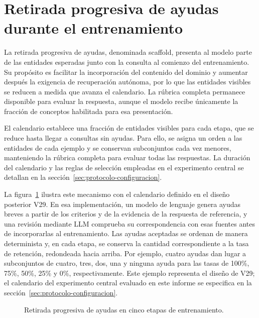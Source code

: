 \section{Retirada progresiva de ayudas durante el entrenamiento}
\label{sec:metodo-ayudas}
La retirada progresiva de ayudas, denominada scaffold, presenta al modelo parte de las entidades esperadas junto con la consulta al comienzo del entrenamiento. Su propósito es facilitar la incorporación del contenido del dominio y aumentar después la exigencia de recuperación autónoma, por lo que las entidades visibles se reducen a medida que avanza el calendario. La rúbrica completa permanece disponible para evaluar la respuesta, aunque el modelo recibe únicamente la fracción de conceptos habilitada para esa presentación.

El calendario establece una fracción de entidades visibles para cada etapa, que se reduce hasta llegar a consultas sin ayudas. Para ello, se asigna un orden a las entidades de cada ejemplo y se conservan subconjuntos cada vez menores, manteniendo la rúbrica completa para evaluar todas las respuestas. La duración del calendario y las reglas de selección empleadas en el experimento central se detallan en la sección~\ref{sec:protocolo-configuracion}.

La figura~\ref{fig:scaffolding-etapas} ilustra este mecanismo con el calendario definido en el diseño posterior V29. En esa implementación, un modelo de lenguaje genera ayudas breves a partir de los criterios y de la evidencia de la respuesta de referencia, y una revisión mediante LLM comprueba su correspondencia con esas fuentes antes de incorporarlas al entrenamiento. Las ayudas aceptadas se ordenan de manera determinista y, en cada etapa, se conserva la cantidad correspondiente a la tasa de retención, redondeada hacia arriba. Por ejemplo, cuatro ayudas dan lugar a subconjuntos de cuatro, tres, dos, una y ninguna ayuda para las tasas de 100\%, 75\%, 50\%, 25\% y 0\%, respectivamente. Este ejemplo representa el diseño de V29; el calendario del experimento central evaluado en este informe se especifica en la sección~\ref{sec:protocolo-configuracion}.

\begin{figure}[htbp]
\centering

\caption{Retirada progresiva de ayudas en cinco etapas de entrenamiento.}
\label{fig:scaffolding-etapas}
\end{figure}

